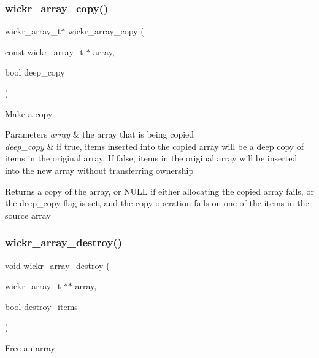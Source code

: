 \subsubsection{\texorpdfstring{wickr\+\_\+array\+\_\+copy()}{wickr\_array\_copy()}}
{\footnotesize\ttfamily wickr\+\_\+array\+\_\+t$\ast$ wickr\+\_\+array\+\_\+copy (\begin{DoxyParamCaption}\item[{const wickr\+\_\+array\+\_\+t $\ast$}]{array,  }\item[{bool}]{deep\+\_\+copy }\end{DoxyParamCaption})}

Make a copy


\begin{DoxyParams}{Parameters}
{\em array} & the array that is being copied \\
\hline
{\em deep\+\_\+copy} & if true, items inserted into the copied array will be a deep copy of items in the original array. If false, items in the original array will be inserted into the new array without transferring ownership \\
\hline
\end{DoxyParams}
\begin{DoxyReturn}{Returns}
a copy of the array, or N\+U\+LL if either allocating the copied array fails, or the deep\+\_\+copy flag is set, and the copy operation fails on one of the items in the source array 
\end{DoxyReturn}
\mbox{\label{group__wickr__array_ga984338e0a278ef1b23aca7330f0bfcc3}} 
\subsubsection{\texorpdfstring{wickr\+\_\+array\+\_\+destroy()}{wickr\_array\_destroy()}}
{\footnotesize\ttfamily void wickr\+\_\+array\+\_\+destroy (\begin{DoxyParamCaption}\item[{wickr\+\_\+array\+\_\+t $\ast$$\ast$}]{array,  }\item[{bool}]{destroy\+\_\+items }\end{DoxyParamCaption})}

Free an array


